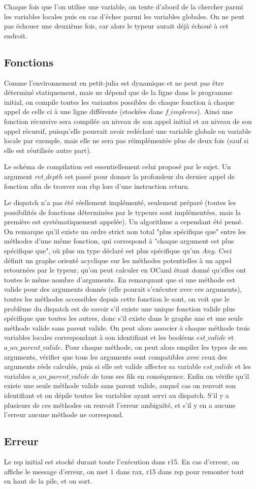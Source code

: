 \documentclass[10pt,a4paper]{article}
\begin{document}
Chaque fois que l'on utilise une variable, on tente d'abord de la chercher parmi les variables locales puis en cas d'échec parmi les variables globales. On ne peut pas échouer une deuxième fois, car alors le typeur aurait déjà échoué à cet endroit.

\subsection{Fonctions}

Comme l'environnement en petit-julia est dynamique et ne peut pas être déterminé
statiquement, mais ne dépend que de la ligne dans le programme initial, on compile
toutes les variantes possibles de chaque fonction à chaque appel de celle ci à une
ligne différente (stockées dans $f\_implems$). Ainsi une fonction récursive sera
compilée au niveau de son appel initial et au niveau de son appel récursif, puisqu'elle
pourrait avoir redéclaré une variable globale en variable locale par exemple, mais elle
ne sera pas réimplémentée plus de deux fois (sauf si elle est réutilisée autre part).

Le schéma de compilation est essentiellement celui proposé par le sujet. Un argument
$ret\_depth$ est passé pour donner la profondeur du dernier appel de fonction afin
de trouver son rbp lors d'une instruction return.

Le dispatch n'a pas été réellement implémenté, seulement préparé (toutes les
possibilités de fonctions déterminées par le typeurs sont implémentées, mais la
première est systématiquement appelée). Un algorithme a cependant été pensé. On remarque
qu'il existe un ordre strict non total "plus spécifique que" entre les méthodes d'une même
fonction, qui correspond à "chaque argument est plus spécifique que", où plus un type
déclaré est plus spécifique qu'un $Any$. Ceci définit un graphe orienté acyclique sur
les méthodes potentielles à un appel retournées par le typeur, qu'on peut calculer en
OCaml étant donné qu'elles ont toutes le même nombre d'arguments. En remarquant que si
une méthode est valide pour des arguments donnés (elle pourait s'exécuter avec ces
arguments), toutes les méthodes accessibles depuis cette fonction le sont, on voit que
le problème du dispatch est de savoir s'il existe une unique fonction valide plus
spécifique que toutes les autres, donc s'il existe dans le graphe une et une seule
méthode valide sans parent valide.
On peut alors
associer à chaque méthode trois variables locales correspondant à son identifiant et
les booléens $est\_valide$ et $a\_un\_parent\_valide$. Pour chaque méthode, on peut
alors empiler les types de ses arguments, vérifier que tous les arguments sont compatibles
avec ceux des arguments réels calculés, puis si elle est valide affecter sa variable
$est\_valide$ et les variables $a\_un\_parent\_valide$ de tous ses fils en conséquence.
Enfin on vérifie qu'il existe une seule méthode valide sans parent valide, auquel cas
on renvoit son identifiant et on dépile toutes les variables ayant servi au dispatch. S'il y a plusieurs de ces méthodes on renvoit l'erreur ambiguïté, et s'il y en a aucune l'erreur aucune méthode ne correspond.

\subsection{Erreur}
Le rsp initial est stocké durant toute l'exécution dans r15. En cas d'erreur, on affiche le message d'erreur, on met $1$ dans rax, r15 dans rsp pour remonter tout en haut de la pile, et on sort.
\end{document}
